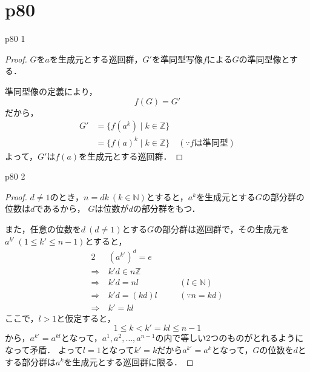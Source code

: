 \documentclass[dvipdfmx,uplatex,11pt]{jsarticle}
\theoremstyle{mytheorem}
\begin{document}
        \section{p80}
        p80 1
        \begin{leftbar}
            \begin{proof}
                $G$を$a$を生成元とする巡回群，$G'$を準同型写像$f$による$G$の準同型像とする．

                準同型像の定義により，
                \[
                    f(G)=G'
                \]
                だから，
                \begin{align*}
                    G' & =\{ f(a^k)\mid k \in \mathbb{Z}\} \\
                    & = \{ {f(a)}^k \mid k \in \mathbb{Z}\} \quad (\because \text{$f$は準同型})
                \end{align*}
                よって，$G'$は$f(a)$を生成元とする巡回群．
            \end{proof}
        \end{leftbar}
        p80 2 
        \begin{leftbar}
            \begin{proof}
                $ d\ne 1$のとき，$n=dk~(k \in \mathbb{N})$とすると，$a^k$を生成元とする$G$の部分群の位数は$d$であるから，
                $G$は位数が$d$の部分群をもつ．

                また，任意の位数を$d~(d \ne1)$とする$G$の部分群は巡回群で，その生成元を$a^{k'}~(1 \le k' \le n-1)$とすると，
                \begin{alignat*}{2}
                    & (a^{k'})^d=e &&\\
                    \Longrightarrow ~& k'd \in n\mathbb{Z} &&\\
                    \Longrightarrow ~& k'd = n l & \quad & (l \in \mathbb{N}) \\
                    \Longrightarrow ~& k'd =(kd)l & \quad & (\because n=kd) \\
                    \Longrightarrow ~& k' =kl
                \end{alignat*}
                ここで，$l>1$と仮定すると，
                \[
                    1 \le k <k' = kl \le n-1
                \]
                から，$a^{k'}=a^{kl}$となって，$a^1,a^2,\dots,a^{n-1}$の内で等しい2つのものがとれるようになって矛盾．
                よって$l=1$となって$k'=k$だから$a^{k'}=a^{k}$となって，$G$の位数を$d$とする部分群は$a^k$を生成元とする巡回群に限る．
            \end{proof}
        \end{leftbar}
\end{document}
